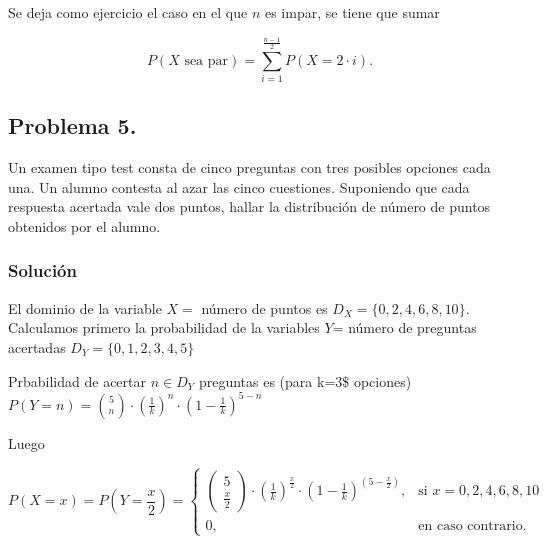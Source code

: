 \documentclass[
]{article}
\begin{document}
Se deja como ejercicio el caso en el que \(n\) es impar, se tiene que
sumar

\[
P(X\mbox{ sea par})=\sum_{i=1}^{\frac{n-1}{2}} P(X=2\cdot i).
\]

\hypertarget{problema-5.}{%
\subsection{Problema 5.}\label{problema-5.}}

Un examen tipo test consta de cinco preguntas con tres posibles opciones
cada una. Un alumno contesta al azar las cinco cuestiones. Suponiendo
que cada respuesta acertada vale dos puntos, hallar la distribución de
número de puntos obtenidos por el alumno.

\hypertarget{soluciuxf3n-4}{%
\subsubsection{Solución}\label{soluciuxf3n-4}}

El dominio de la variable \(X=\) número de puntos es
\(D_X=\{0,2,4,6,8,10\}\). Calculamos primero la probabilidad de la
variables \(Y\)= número de preguntas acertadas \(D_Y=\{0,1,2,3,4,5\}\)

Prbabilidad de acertar \(n\in D_Y\) preguntas es (para k=3\$ opciones)
\(P(Y=n)={5 \choose n}\cdot \left(\frac1k\right)^n\cdot \left(1-\frac1k\right)^{5-n}\)

Luego

\[
P(X=x)=P\left(Y=\frac{x}{2}\right)=\begin{cases}
\left(\begin{array}{c}5\\\frac{x}{2}\end{array}\right)\cdot \left(\frac1k\right)^\frac{x}{2}\cdot \left(1-\frac1k\right)^{\left(5-\frac{x}{2}\right)}, & \mbox{si }x=0,2,4,6,8,10 \\
0, & \mbox{en caso contrario.}
\end{cases}
\]
\end{document}
